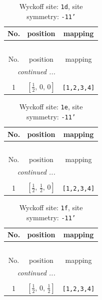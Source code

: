 \documentclass[fleqn,8pt]{jsarticle}
\begin{document}
\renewcommand{\arraystretch}{1.2}
\begin{longtable}{ccc}
\caption{Wyckoff site: {\tt 1d}, site symmetry: {\tt -11'}}
 \\
 \hline \hline
No. & position & mapping \\ \hline \endfirsthead

\multicolumn{2}{l}{\tablename\ \thetable{}} \\
 \hline \hline
No. & position & mapping \\ \hline \endhead

 \hline \hline
\multicolumn{2}{r}{\footnotesize\it continued ...} \\ \endfoot

 \hline \hline
\multicolumn{2}{r}{} \\ \endlastfoot

1 & $\left[ \frac{1}{2},\, 0,\, 0 \right]$ & {\tt [1,2,3,4]} \\
\end{longtable}
\renewcommand{\arraystretch}{1.2}
\begin{longtable}{ccc}
\caption{Wyckoff site: {\tt 1e}, site symmetry: {\tt -11'}}
 \\
 \hline \hline
No. & position & mapping \\ \hline \endfirsthead

\multicolumn{2}{l}{\tablename\ \thetable{}} \\
 \hline \hline
No. & position & mapping \\ \hline \endhead

 \hline \hline
\multicolumn{2}{r}{\footnotesize\it continued ...} \\ \endfoot

 \hline \hline
\multicolumn{2}{r}{} \\ \endlastfoot

1 & $\left[ \frac{1}{2},\, \frac{1}{2},\, 0 \right]$ & {\tt [1,2,3,4]} \\
\end{longtable}
\renewcommand{\arraystretch}{1.2}
\begin{longtable}{ccc}
\caption{Wyckoff site: {\tt 1f}, site symmetry: {\tt -11'}}
 \\
 \hline \hline
No. & position & mapping \\ \hline \endfirsthead

\multicolumn{2}{l}{\tablename\ \thetable{}} \\
 \hline \hline
No. & position & mapping \\ \hline \endhead

 \hline \hline
\multicolumn{2}{r}{\footnotesize\it continued ...} \\ \endfoot

 \hline \hline
\multicolumn{2}{r}{} \\ \endlastfoot

1 & $\left[ \frac{1}{2},\, 0,\, \frac{1}{2} \right]$ & {\tt [1,2,3,4]} \\
\end{longtable}
\end{document}
